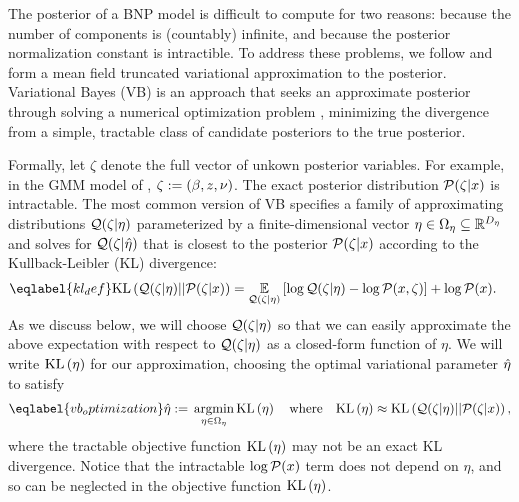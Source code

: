 The posterior of a BNP model is difficult to compute for two reasons: because
the number of components is (countably) infinite, and because the posterior
normalization constant is intractible.  To address these problems, we follow
\citet{blei:2006:vi_for_dp} and form a mean field truncated variational
approximation to the posterior. Variational Bayes (VB) is an approach that seeks
an approximate posterior through solving a numerical optimization problem
\citep{jordan:1999:vi, wainwright:2008:graphical_models, blei:2017:vi_review},
minimizing the divergence from a simple, tractable class of candidate posteriors
to the true posterior.

Formally, let $\zeta$ denote the full vector of unkown posterior variables. For
example, in the GMM model of , $\zeta := (\beta, z,
\nu)$.  The exact posterior distribution $\mathcal{P}(\zeta \vert x)$ is intractable.
The most common version of VB specifies a family of approximating distributions
$\mathcal{Q}(\zeta \vert \eta)$ parameterized by a finite-dimensional vector $\eta \in
\Omega_{\eta} \subseteq \mathbb{R}^{{D_{\eta}}}$ and solves for $\mathcal{Q}(\zeta\vert\hat\eta)$
that is closest to the posterior $\mathcal{P}(\zeta \vert x)$ according to  the
Kullback-Leibler (KL) divergence:
%
\begin{align}\eqlabel{kl_def}
%
\KL{\q(\zeta \vert \eta) || \p(\zeta \vert \x)}
={}&    \expect{\q(\zeta \vert \eta)}{
        \log \q(\zeta \vert \eta) - \logp(\x, \zeta)} + \logp(\x).
%
\end{align}
%
As we discuss below, we will choose $\mathcal{Q}(\zeta \vert \eta)$ so that we can easily
approximate the above expectation with respect to $\mathcal{Q}(\zeta \vert \eta)$ as a
closed-form function of $\eta$.  We will write $\mathrm{KL}\left(\eta\right)$ for our
approximation, choosing the optimal variational parameter $\hat\eta$ to satisfy
%
\begin{align}\eqlabel{vb_optimization}
%
\etaopt :={} \argmin_{\eta \in \etadom} \KL{\eta} \mathwhere
\KL{\eta} \approx{} \KL{\q(\zeta \vert \eta) || \p(\zeta \vert \x)},
%
\end{align}
%
where the tractable objective function $\mathrm{KL}\left(\eta\right)$ may not be an exact KL
divergence. Notice that the intractable $\log \mathcal{P}(x)$ term does not depend on
$\eta$, and so can be neglected in the objective function $\mathrm{KL}\left(\eta\right)$.

